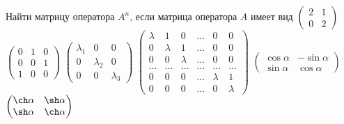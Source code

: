 \documentclass[12pt]{article}
\begin{document}
\z Найти матрицу оператора $A^n$, если матрица оператора $A$ имеет вид
	\p $\begin{pmatrix}2 & 1 \\ 0 & 2 \end{pmatrix}$
	\p $\begin{pmatrix}0&1&0 \\ 0&0&1 \\ 1&0&0 \end{pmatrix}$
	\p $\begin{pmatrix}\lambda_1&0&0 \\ 0&\lambda_2&0 \\ 0&0&\lambda_3 \end{pmatrix}$
	\p $\begin{pmatrix}\lambda&1&0 &\dots&0&0 \\ 0&\lambda&1 &\dots&0&0 \\ 0&0&\lambda &\dots&0&0 \\ \dots&\dots&\dots&\dots&\dots&\dots \\ 0&0&0&\dots&\lambda&1 \\ 0&0&0&\dots&0&\lambda \end{pmatrix}$
	\p $\begin{pmatrix}\cos\alpha & -\sin\alpha \\ \sin\alpha & \cos\alpha \end{pmatrix}$
	\p $\begin{pmatrix}\ch\alpha & \sh\alpha \\ \sh\alpha & \ch\alpha \end{pmatrix}$
\end{document}
